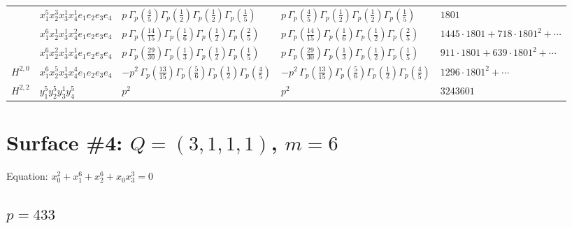\documentclass[11pt]{article}
\begin{document}
\begin{table}[ht]
{\begin{tabular}{@{}lllll@{}}
 & $x_{1}^{5} x_{2}^{3} x_{3}^{1} x_{4}^{1}  e_{1} e_{2} e_{3} e_{4}$ & $p \, \Gamma_p \left( \frac{4}{5} \right) \Gamma_p \left( \frac{1}{2} \right) \Gamma_p \left( \frac{1}{2} \right) \Gamma_p \left( \frac{1}{5} \right)$ & $p \, \Gamma_p \left( \frac{4}{5} \right) \Gamma_p \left( \frac{1}{2} \right) \Gamma_p \left( \frac{1}{2} \right) \Gamma_p \left( \frac{1}{5} \right)$ & $1801$ \\
 & $x_{1}^{6} x_{2}^{1} x_{3}^{1} x_{4}^{2}  e_{1} e_{2} e_{3} e_{4}$ & $p \, \Gamma_p \left( \frac{14}{15} \right) \Gamma_p \left( \frac{1}{6} \right) \Gamma_p \left( \frac{1}{2} \right) \Gamma_p \left( \frac{2}{5} \right)$ & $p \, \Gamma_p \left( \frac{14}{15} \right) \Gamma_p \left( \frac{1}{6} \right) \Gamma_p \left( \frac{1}{2} \right) \Gamma_p \left( \frac{2}{5} \right)$ & $1445{\cdot}1801{+}718{\cdot}1801^{2}{+}\cdots$ \\
 & $x_{1}^{6} x_{2}^{2} x_{3}^{1} x_{4}^{1}  e_{1} e_{2} e_{3} e_{4}$ & $p \, \Gamma_p \left( \frac{29}{30} \right) \Gamma_p \left( \frac{1}{3} \right) \Gamma_p \left( \frac{1}{2} \right) \Gamma_p \left( \frac{1}{5} \right)$ & $p \, \Gamma_p \left( \frac{29}{30} \right) \Gamma_p \left( \frac{1}{3} \right) \Gamma_p \left( \frac{1}{2} \right) \Gamma_p \left( \frac{1}{5} \right)$ & $911{\cdot}1801{+}639{\cdot}1801^{2}{+}\cdots$ \\
\midrule
$H^{2,0}$ & $x_{1}^{6} x_{2}^{5} x_{3}^{1} x_{4}^{4}  e_{1} e_{2} e_{3} e_{4}$ & $- p^{2} \, \Gamma_p \left( \frac{13}{15} \right) \Gamma_p \left( \frac{5}{6} \right) \Gamma_p \left( \frac{1}{2} \right) \Gamma_p \left( \frac{4}{5} \right)$ & $- p^{2} \, \Gamma_p \left( \frac{13}{15} \right) \Gamma_p \left( \frac{5}{6} \right) \Gamma_p \left( \frac{1}{2} \right) \Gamma_p \left( \frac{4}{5} \right)$ & $1296{\cdot}1801^{2}{+}\cdots$ \\
\midrule
$H^{2,2}$ & $y_{1}^{5} y_{2}^{5} y_{3}^{1} y_{4}^{5}$ & $p^{2} \,$ & $p^{2} \,$ & $3243601$ \\
\bottomrule
\end{tabular}
}
\renewcommand{\arraystretch}{1.0}
\end{table}

\newpage

\section*{Surface \#4: $Q=(3, 1, 1, 1)$, $m=6$}

Equation: $x_0^{2} + x_1^{6} + x_2^{6} + x_0 x_3^{3} = 0$

\subsection*{$p = 433$}
\end{document}
